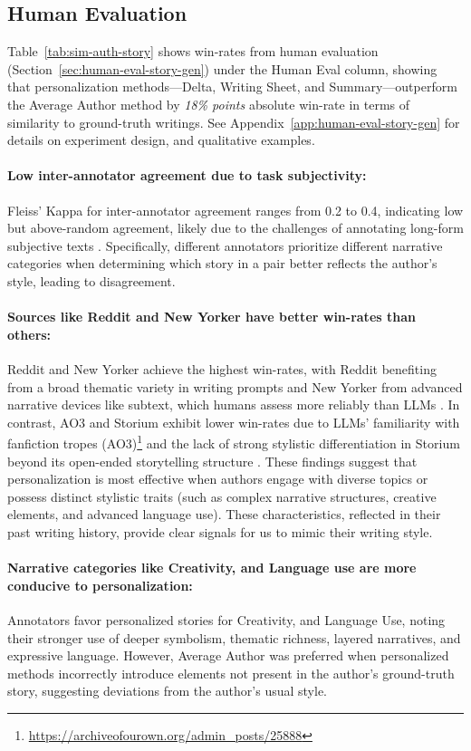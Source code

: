 \subsection{Human Evaluation}

Table~\ref{tab:sim-auth-story} shows win-rates from human evaluation (Section~\ref{sec:human-eval-story-gen}) under the Human Eval column, showing that personalization methods—Delta, Writing Sheet, and Summary—outperform the Average Author method by \emph{18\% points} absolute win-rate in terms of similarity to ground-truth writings. See Appendix~\ref{app:human-eval-story-gen} for details on experiment design, and qualitative examples. 

\paragraph{Low inter-annotator agreement due to task subjectivity:}
Fleiss’ Kappa for inter-annotator agreement ranges from 0.2 to 0.4, indicating low but above-random agreement, likely due to the challenges of annotating long-form subjective texts \citep{subbiah-etal-2024-storysumm}. Specifically, different annotators prioritize different narrative categories when determining which story in a pair better reflects the author’s style, leading to disagreement. 

\paragraph{Sources like Reddit and New Yorker have better win-rates than others:} 
Reddit and New Yorker achieve the highest win-rates, with Reddit benefiting from a broad thematic variety in writing prompts and New Yorker from advanced narrative devices like subtext, which humans assess more reliably than LLMs \citep{subbiah-etal-2024-reading}. In contrast, AO3 and Storium exhibit lower win-rates due to LLMs' familiarity with fanfiction tropes (AO3)\footnote{\url{https://archiveofourown.org/admin_posts/25888}} and the lack of strong stylistic differentiation in Storium beyond its open-ended storytelling structure \citep{xu2024echoes, tian-etal-2024-large-language}. These findings suggest that personalization is most effective when authors engage with diverse topics or possess distinct stylistic traits (such as complex narrative structures, creative elements, and advanced language use). These characteristics, reflected in their past writing history, provide clear signals for us to mimic their writing style.

\paragraph{Narrative categories like Creativity, and Language use are more conducive to personalization:} 
Annotators favor personalized stories for Creativity, and Language Use, noting their stronger use of deeper symbolism, thematic richness, layered narratives, and expressive language. However, Average Author was preferred when personalized methods incorrectly introduce elements not present in the author's ground-truth story, suggesting deviations from the author's usual style. 